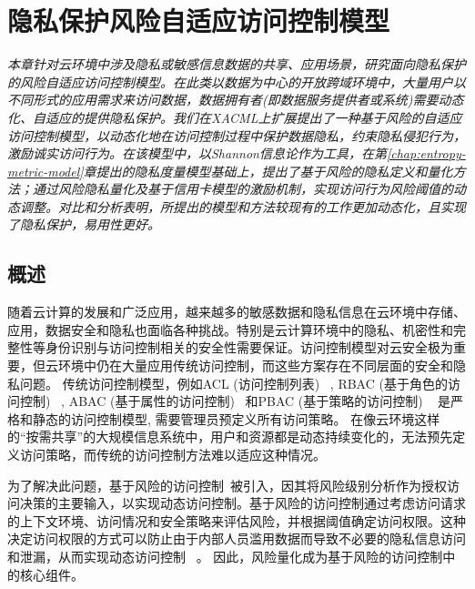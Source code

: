 \chapter{隐私保护风险自适应访问控制模型}
\label{chap:RaBAC-for-privacy}

\textit{ }

\textit{本章针对云环境中涉及隐私或敏感信息数据的共享、应用场景，研究面向隐私保护的风险自适应访问控制模型。在此类以数据为中心的开放跨域环境中，大量用户以不同形式的应用需求来访问数据，数据拥有者(即数据服务提供者或系统)需要动态化、自适应的提供隐私保护。我们在XACML上扩展提出了一种基于风险的自适应访问控制模型，以动态化地在访问控制过程中保护数据隐私，约束隐私侵犯行为，激励诚实访问行为。在该模型中，以Shannon信息论作为工具，在第\ref{chap:entropy-metric-model}章提出的隐私度量模型基础上，提出了基于风险的隐私定义和量化方法；通过风险隐私量化及基于信用卡模型的激励机制，实现访问行为风险阈值的动态调整。对比和分析表明，所提出的模型和方法较现有的工作更加动态化，且实现了隐私保护，易用性更好。
}
\section{概述}
\label{sec:intro}
随着云计算的发展和广泛应用，越来越多的敏感数据和隐私信息在云环境中存储、应用，数据安全和隐私也面临各种挑战。特别是云计算环境中的隐私、机密性和完整性等身份识别与访问控制相关的安全性需要保证。访问控制模型对云安全极为重要，但云环境中仍在大量应用传统访问控制，而这些方案存在不同层面的安全和隐私问题。
传统访问控制模型，例如ACL (访问控制列表) ~\cite{qian2001acla}, RBAC (基于角色的访问控制) ~\cite{jung2012cribac}, ABAC (基于属性的访问控制) ~\cite{zhang2011attribute}和PBAC (基于策略的访问控制) ~\cite{huang2011policy} 是严格和静态的访问控制模型, 需要管理员预定义所有访问策略。 在像云环境这样的“按需共享”的大规模信息系统中，用户和资源都是动态持续变化的，无法预先定义访问策略，而传统的访问控制方法难以适应这种情况。

为了解决此问题，基于风险的访问控制~\cite{ni2010risk,shaikh2012dynamic,wang2011quantified,choi2015framework}被引入，因其将风险级别分析作为授权访问决策的主要输入，以实现动态访问控制。基于风险的访问控制通过考虑访问请求的上下文环境、访问情况和安全策略来评估风险，并根据阈值确定访问权限。这种决定访问权限的方式可以防止由于内部人员滥用数据而导致不必要的隐私信息访问和泄漏，从而实现动态访问控制 ~\cite{chen2011risk}。 因此，风险量化成为基于风险的访问控制中的核心组件。

